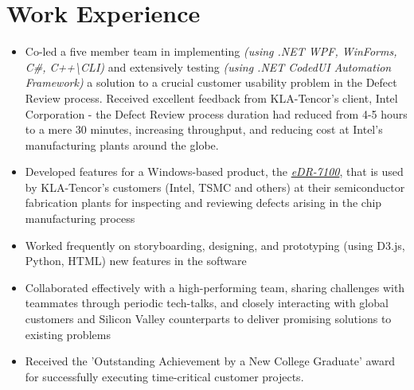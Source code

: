 \section{Work Experience}

	
\vspace{1.8mm}
	\begin{itemize}
		\setlength\itemsep{0.3em}
		\item Co-led a five member team in implementing \emph{(using .NET WPF, WinForms, C\#, C++\textbackslash CLI)} and extensively testing \emph{(using .NET CodedUI Automation Framework)} a solution to a crucial customer usability problem in the Defect Review process. Received excellent feedback from KLA-Tencor's client, Intel Corporation - the Defect Review process duration had reduced from 4-5 hours to a mere 30 minutes, increasing throughput, and reducing cost at Intel's manufacturing plants around the globe.
		\item Developed features for a Windows-based product, the \href{http://www.kla-tencor.com/Defect-Review/edr-7100-series.html}{\emph{eDR-7100}}, that is used by KLA-Tencor's customers (Intel, TSMC and others) at their semiconductor fabrication plants for inspecting and reviewing defects arising in the chip manufacturing process 
		\item Worked frequently on storyboarding, designing, and prototyping (using D3.js, Python, HTML) new features in the software
		\item Collaborated effectively with a high-performing team, sharing challenges with teammates through periodic tech-talks, and closely interacting with global customers and Silicon Valley counterparts to deliver promising solutions to existing problems
		\item Received the 'Outstanding Achievement by a New College Graduate' award for successfully executing time-critical customer projects.
	\end{itemize}
	
